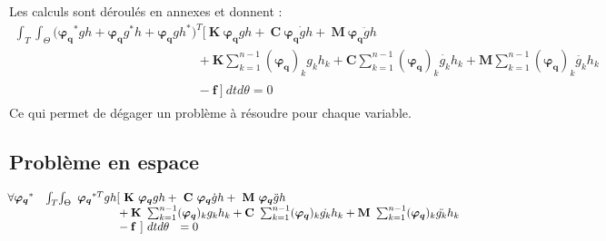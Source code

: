 \documentclass[12pt,a4paper]{report}
\begin{document}
\noindent
Les calculs sont déroulés en annexes et donnent :
\begin{equation}
\!\!\!\!\!\!\!\!\!\!\!\!\!\!\!\!\!\!\!\!\!\!\!\!\!\!\!\!\!\!\!\!\!\!\!\!\!\!\!\!\!\!\!\!\!\!\!
\begin{array}{l}
	\displaystyle	
	\int_T \! \int_\Theta	\!\!
		\big(\boldsymbol{\varphi_q}^*gh + \boldsymbol{\varphi_q}g^*h + \boldsymbol{\varphi_q}gh^*\big)^T \!
					\bigg[~\mathbf{K}~ \boldsymbol{\varphi_q}gh
						+ ~\mathbf{C}~ \boldsymbol{\varphi_q} \dot{g}h 
						+ ~\mathbf{M}~ \boldsymbol{\varphi_q} \ddot{g}h
	\\ 
	  \displaystyle
		\phantom{\int_T\int_\Theta\big(\boldsymbol{\varphi_q}^{*T}gh + \boldsymbol{\varphi_q}g^*h + \boldsymbol{\varphi_q}gh^*}
			+ \mathbf{K} \sum_{k=1}^{n-1} (\boldsymbol{\varphi_q})_k       g_k  h_k 
			+ \mathbf{C} \sum_{k=1}^{n-1} (\boldsymbol{\varphi_q})_k  \dot{g_k} h_k 
			+ \mathbf{M} \sum_{k=1}^{n-1} (\boldsymbol{\varphi_q})_k \ddot{g_k} h_k
	\\ \displaystyle
	  
		\phantom{\int_T\int_\Theta\big(\boldsymbol{\varphi_q}^{*T}gh + \boldsymbol{\varphi_q}g^*h + \boldsymbol{\varphi_q}gh^*} -\mathbf{f}~\bigg] ~dt d\theta
	= 0
\end{array}
\!\!\!\!\!\!\!\!\!\!\!\!\!\!\!\!\!\!\!\!\!\!\!
\end{equation}
Ce qui permet de dégager un problème à résoudre pour chaque variable.


\subsection{Problème en espace}
\label{ProbEspace}
\begin{equation}
\!\!\!\!
\begin{array}{r r l}
	\forall \boldsymbol{\varphi_q}^*
	&\int_T \! \int_\Theta \!\!\!&		
		\boldsymbol{\varphi_q}^{*T}gh [~\mathbf{K}~ \boldsymbol{\varphi_q}gh
						+ ~\mathbf{C}~ \boldsymbol{\varphi_q} \dot{g}h 
						+ ~\mathbf{M}~ \boldsymbol{\varphi_q} \ddot{g}h
	\\
	  &&
		\phantom{\boldsymbol{\varphi_q}^{*T}gh
			}+ \mathbf{K}~ \sum_{k=1}^{n-1} (\boldsymbol{\varphi_q})_k       g_k  h_k 
			+  \mathbf{C}~ \sum_{k=1}^{n-1} (\boldsymbol{\varphi_q})_k  \dot{g_k} h_k 
			+  \mathbf{M}~ \sum_{k=1}^{n-1} (\boldsymbol{\varphi_q})_k \ddot{g_k} h_k
	\\
	  &&
		\phantom{\boldsymbol{\varphi_q}^{*T}gh} -\mathbf{f}~] ~dt d\theta ~~= 0
\end{array}
\end{equation}
\end{document}
